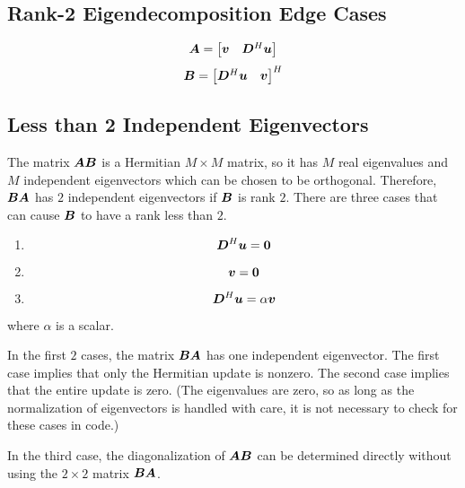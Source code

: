 \begin{appendices}
\chapter{Rank-2 Eigendecomposition Edge Cases} \label{chapter:eigenedge}
\begin{equation}
\bm{A} = \begin{bmatrix}  \bm{v}  &  \bm{D}^H\bm{u} \end{bmatrix}
\end{equation}
\begin{equation}
\bm{B} = \begin{bmatrix} \bm{D}^H\bm{u} & \bm{v}\end{bmatrix}^H
\end{equation}
\section{Less than 2 Independent Eigenvectors}




The matrix $\bm{A}\bm{B}$ is a Hermitian $M \times M$ matrix, so it has $M$ real eigenvalues and $M$ independent eigenvectors which can be chosen to be orthogonal. Therefore, $\bm{B}\bm{A}$ has $2$ independent eigenvectors if $\bm{B}$ is rank $2$.  There are three cases that can cause $\bm{B}$ to have a rank less than $2$.


\begin{enumerate}
\item
\begin{equation}
\bm{D}^H\bm{u} = \bm{0}
\end{equation}
\item

\begin{equation}
\bm{v} = \bm{0}
\end{equation}
\item
\begin{equation}
\bm{D}^H\bm{u} = \alpha \bm{v}
\end{equation}
\end{enumerate}
where $\alpha$ is a scalar.

In the first $2$ cases, the matrix $\bm{B}\bm{A}$ has one independent eigenvector. The first case implies that only the Hermitian update is nonzero.  The second case implies that the entire update is zero. (The eigenvalues are zero, so as long as the normalization of eigenvectors is handled with care, it is not necessary to check for these cases in code.)

In the third case, the diagonalization of $\bm{A}\bm{B}$ can be determined directly without using the $2 \times 2$ matrix $\bm{B}\bm{A}$.


\end{appendices}
